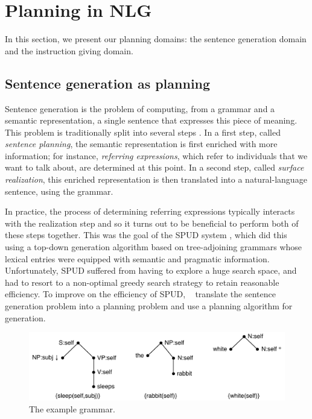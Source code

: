 \section{Planning in NLG} \label{sec:domains}

In this section, we present our planning domains: the sentence
generation domain and the instruction giving domain.


\subsection{Sentence generation as planning}

Sentence generation is the problem of computing, from a grammar and a
semantic representation, a single sentence that expresses this piece of
meaning.  This problem is traditionally split into several steps
\cite{reiter00building}.  In a first step, called \emph{sentence planning},
the semantic representation is first enriched with more information; for
instance, \emph{referring expressions}, which refer to individuals
that we want to talk about, are determined at this point. In a second
step, called \emph{surface realization}, this enriched representation is
then translated into a natural-language sentence, using the grammar.

In practice, the process of determining referring expressions
typically interacts with the realization step and so it turns out to
be beneficial to perform both of these steps together. This was the
goal of the SPUD system \cite{Stone2003a}, which did this using a
top-down generation algorithm based on tree-adjoining grammars
\cite{joshi;etal1997} whose lexical entries were equipped with
semantic and pragmatic information. Unfortunately, SPUD suffered from
having to explore a huge search space, and had to resort to a
non-optimal greedy search strategy to retain reasonable efficiency.
To improve on the efficiency of SPUD,
\citeauthor{KolSto07}~ translate the sentence
generation problem into a planning problem and use a planning
algorithm for generation.

\begin{figure}
  \centering
  \includegraphics[width=\columnwidth]{pic-grammar}
  \caption{The example grammar.}
  \label{fig:white-rabbit-sleeps-grammar}
\end{figure}

